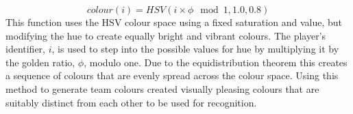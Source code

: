 \begin{equation*}
	colour(i) = HSV(i \times \phi \mod 1, 1.0, 0.8)
\end{equation*}
\noindent
This function uses the HSV colour space using a fixed saturation and value, but modifying the hue to create equally bright and vibrant colours. The player's identifier, $i$, is used to step into the possible values for hue by multiplying it by the golden ratio, $\phi$, modulo one. Due to the equidistribution theorem this creates a sequence of colours that are evenly spread across the colour space. Using this method to generate team colours created visually pleasing colours that are suitably distinct from each other to be used for recognition.
